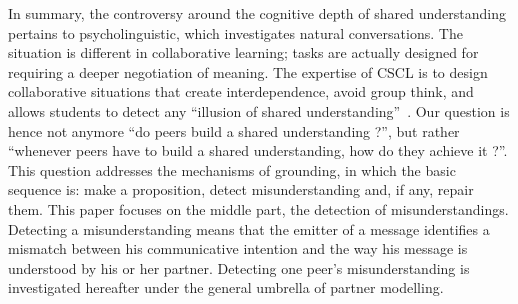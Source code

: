 \documentclass[natbib]{svjour3}
\newcommand{\A}{A\xspace}
\newcommand{\B}{B\xspace}
\begin{document}
%
%
%

\vspace{2em}

In summary, the controversy around the cognitive depth of shared understanding
pertains to psycholinguistic, which investigates natural conversations. The
situation is different in collaborative learning; tasks are actually designed
for requiring a deeper negotiation of meaning.  The expertise of CSCL is to design
collaborative situations that create interdependence, avoid group think, and
allows students to detect any ``illusion of shared
understanding''~\citet{cherubini2005grounding}. Our question is hence not
anymore ``do peers build a shared
understanding ?'', but rather ``whenever peers have to build a shared understanding,
how do they achieve it ?''.  This question addresses the mechanisms of grounding, in
which the basic sequence is: make a proposition, detect misunderstanding and, if
any, repair them.  This paper focuses on the middle part, the detection of
misunderstandings.  Detecting a misunderstanding means that the emitter of a
message identifies a mismatch between his communicative intention and the way
his message is understood by his or her partner. Detecting one peer's
misunderstanding is investigated hereafter under the general umbrella of partner
modelling.
\end{document}
